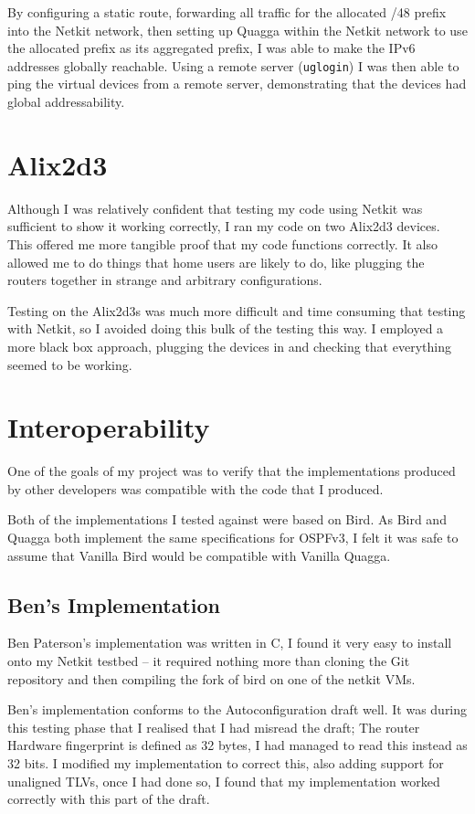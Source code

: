 \documentclass[12pt]{report}
\begin{document}
By configuring a static route, forwarding all traffic for the allocated /48
prefix into the Netkit network, then setting up Quagga within the Netkit
network to use the allocated prefix as its aggregated prefix, I was able to
make the IPv6 addresses globally reachable. Using a remote server
(\texttt{uglogin}) I was then able to ping the virtual devices from a remote
server, demonstrating that the devices had global addressability.

\section{Alix2d3}
Although I was relatively confident that testing my code using Netkit was
sufficient to show it working correctly, I ran my code on two Alix2d3 devices.
This offered me more tangible proof that my code functions correctly. It also
allowed me to do things that home users are likely to do, like plugging the
routers together in strange and arbitrary configurations.

Testing on the Alix2d3s was much more difficult and time consuming that testing
with Netkit, so I avoided doing this bulk of the testing this way. I employed a
more black box approach, plugging the devices in and checking that everything
seemed to be working. 

\section{Interoperability}
One of the goals of my project was to verify that the implementations produced
by other developers was compatible with the code that I produced. 

Both of the implementations I tested against were based on Bird. As Bird and
Quagga both implement the same specifications for OSPFv3, I felt it was safe to
assume that Vanilla Bird would be compatible with Vanilla Quagga. 

\subsection{Ben's Implementation}
Ben Paterson's implementation was written in C, I found it very easy to install onto my
Netkit testbed -- it required nothing more than cloning the Git repository and
then compiling the fork of bird on one of the netkit VMs. 

Ben's implementation conforms to the Autoconfiguration draft well. It was
during this testing phase that I realised that I had misread the draft; The
router Hardware fingerprint is defined as 32 bytes, I had managed to read this
instead as 32 bits. I modified my implementation to correct this, also adding
support for unaligned TLVs, once I had done so, I found that my implementation
worked correctly with this part of the draft.
\end{document}
